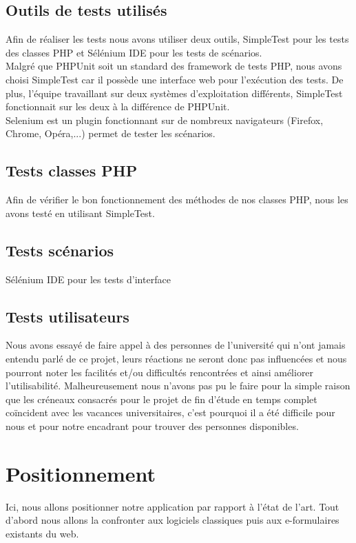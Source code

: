 \documentclass{sigplanconf}
\begin{document}
\subsection{Outils de tests utilisés}
Afin de réaliser les tests nous avons utiliser deux outils, SimpleTest pour les tests des classes PHP et Sélénium IDE pour les tests de scénarios.\\
Malgré que PHPUnit soit un standard des framework de tests PHP, nous avons choisi SimpleTest car il possède une interface web pour l’exécution des tests. De plus, l’équipe travaillant sur deux systèmes d’exploitation différents, SimpleTest fonctionnait sur les deux à la différence de PHPUnit.\\
Selenium est un plugin fonctionnant sur de nombreux navigateurs (Firefox, Chrome, Opéra,...) permet de tester les scénarios.

\subsection{Tests classes PHP}
Afin de vérifier le bon fonctionnement des méthodes de nos classes PHP, nous les avons testé en utilisant SimpleTest.

\subsection{Tests scénarios}
Sélénium IDE pour les tests d’interface

\subsection{Tests utilisateurs}
Nous avons essayé de faire appel à des personnes de l’université qui n’ont jamais entendu parlé de ce projet, leurs réactions ne seront donc pas influencées et nous pourront noter les facilités et/ou difficultés rencontrées et ainsi améliorer l’utilisabilité. Malheureusement nous n’avons pas pu le faire pour la simple raison que les créneaux consacrés pour le projet de fin d'étude en temps complet coïncident avec les vacances universitaires, c’est pourquoi il a été difficile pour nous et pour notre encadrant pour trouver des personnes disponibles.

\section{Positionnement}
Ici, nous allons positionner notre application par rapport à l’état de l’art. Tout d’abord nous allons la confronter aux logiciels classiques puis aux e-formulaires existants du web.
\end{document}
